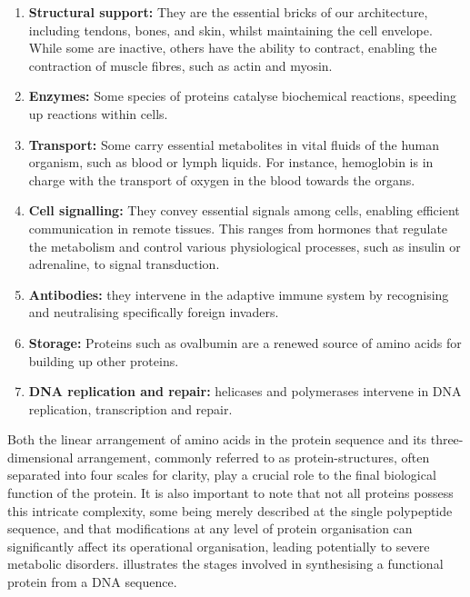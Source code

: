 \begin{enumerate}[label=(\alph*)]
\item \textbf{Structural support:} They are the essential bricks of our architecture, including tendons, bones, and skin, whilst maintaining the cell envelope. While some are inactive, others have the ability to contract, enabling the contraction of muscle fibres, such as actin and myosin.
\item \textbf{Enzymes:} Some species of proteins catalyse biochemical reactions, speeding up reactions within cells.
\item \textbf{Transport:} Some carry essential metabolites in vital fluids of the human organism, such as blood or lymph liquids. For instance, hemoglobin is in charge with the transport of oxygen in the blood towards the organs. 
\item \textbf{Cell signalling:} They convey essential signals among cells, enabling efficient communication in remote tissues. This ranges from hormones that regulate the \gls{metabolism} and control various physiological processes, such as insulin or adrenaline, to signal \gls{transduction}.
\item \textbf{Antibodies:} they intervene in the adaptive immune system by recognising and neutralising specifically foreign invaders.
\item \textbf{Storage:} Proteins such as ovalbumin are a renewed source of amino acids for building up other proteins.
\item \textbf{DNA replication and repair:} helicases and polymerases intervene in DNA replication, transcription and repair.
\end{enumerate}

Both the linear arrangement of amino acids in the protein sequence and its three-dimensional arrangement, commonly referred to as \Glspl{protein-structure}, often separated into four scales for clarity, play a crucial role to the final biological function of the protein. It is also important to note that not all proteins possess this intricate complexity, some being merely described at the single polypeptide sequence, and that modifications at any level of protein organisation can significantly affect its operational organisation, leading potentially to severe metabolic disorders.  illustrates the stages involved in synthesising a functional protein from a DNA sequence. 

